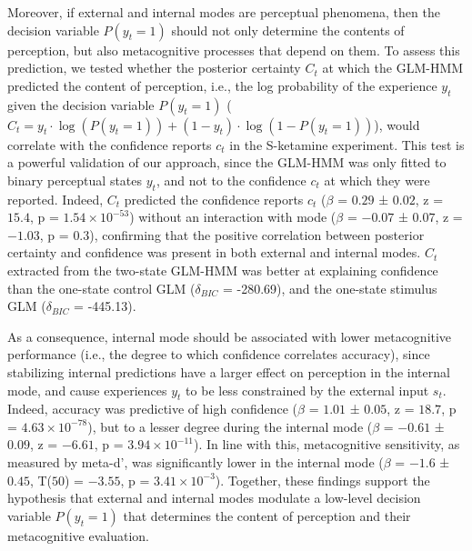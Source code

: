 \documentclass[
]{article}
\begin{document}
Moreover, if external and internal modes are perceptual phenomena, then
the decision variable \(P(y_t = 1)\) should not only determine the
contents of perception, but also metacognitive processes that depend on
them. To assess this prediction, we tested whether the posterior
certainty \(C_t\) at which the GLM-HMM predicted the content of
perception, i.e., the log probability of the experience \(y_t\) given
the decision variable \(P(y_t = 1)\)
(\(C_t = y_t \cdot \log(P(y_t = 1)) + (1 - y_t) \cdot \log(1 - P(y_t = 1))\)),
would correlate with the confidence reports \(c_t\) in the S-ketamine
experiment. This test is a powerful validation of our approach, since
the GLM-HMM was only fitted to binary perceptual states \(y_t\), and not
to the confidence \(c_t\) at which they were reported. Indeed, \(C_t\)
predicted the confidence reports \(c_t\) (\(\beta\) = \(0.29\) ±
\(0.02\), z = \(15.4\), p = \(\ensuremath{1.54\times 10^{-53}}\))
without an interaction with mode (\(\beta\) = \(-0.07\) ± \(0.07\), z =
\(-1.03\), p = \(0.3\)), confirming that the positive correlation
between posterior certainty and confidence was present in both external
and internal modes. \(C_t\) extracted from the two-state GLM-HMM was
better at explaining confidence than the one-state control GLM
(\(\delta_{BIC}\) = -280.69), and the one-state stimulus GLM
(\(\delta_{BIC}\) = -445.13).

As a consequence, internal mode should be associated with lower
metacognitive performance (i.e., the degree to which confidence
correlates accuracy), since stabilizing internal predictions have a
larger effect on perception in the internal mode, and cause experiences
\(y_t\) to be less constrained by the external input \(s_t\). Indeed,
accuracy was predictive of high confidence (\(\beta\) = \(1.01\) ±
\(0.05\), z = \(18.7\), p = \(\ensuremath{4.63\times 10^{-78}}\)), but
to a lesser degree during the internal mode (\(\beta\) = \(-0.61\) ±
\(0.09\), z = \(-6.61\), p = \(\ensuremath{3.94\times 10^{-11}}\)). In
line with this, metacognitive sensitivity, as measured by meta-d', was
significantly lower in the internal mode (\(\beta\) = \(-1.6\) ±
\(0.45\), T(\(50\)) = \(-3.55\), p =
\(\ensuremath{3.41\times 10^{-3}}\)). Together, these findings support
the hypothesis that external and internal modes modulate a low-level
decision variable \(P(y_t = 1)\) that determines the content of
perception and their metacognitive evaluation.
\end{document}
